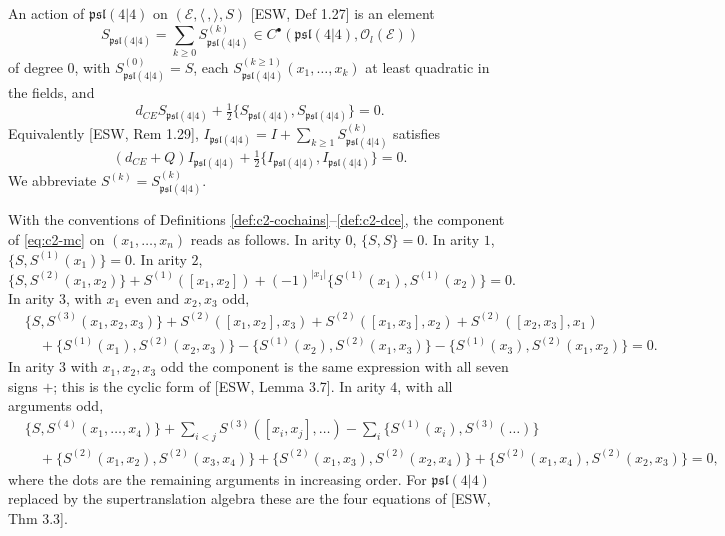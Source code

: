 \begin{definition}
\label{def:c2-action}
An action of $\mathfrak{psl}(4|4)$ on $(\mathscr E,\langle\,,\rangle,S)$ [ESW, Def 1.27] is an element
\[
S_{\mathfrak{psl}(4|4)}=\sum_{k\ge0}S^{(k)}_{\mathfrak{psl}(4|4)}\in C^\bullet(\mathfrak{psl}(4|4),\mathscr O_l(\mathscr E))
\]
of degree $0$, with $S^{(0)}_{\mathfrak{psl}(4|4)}=S$, each $S^{(k\ge1)}_{\mathfrak{psl}(4|4)}(x_1,\dots,x_k)$ at least quadratic in the fields, and
\begin{equation}
d_{CE}S_{\mathfrak{psl}(4|4)}+\tfrac12\{S_{\mathfrak{psl}(4|4)},S_{\mathfrak{psl}(4|4)}\}=0 .
\label{eq:c2-mc}
\end{equation}
Equivalently [ESW, Rem 1.29], $I_{\mathfrak{psl}(4|4)}=I+\sum_{k\ge1}S^{(k)}_{\mathfrak{psl}(4|4)}$ satisfies
\[
(d_{CE}+Q)I_{\mathfrak{psl}(4|4)}+\tfrac12\{I_{\mathfrak{psl}(4|4)},I_{\mathfrak{psl}(4|4)}\}=0 .
\]
We abbreviate $S^{(k)}=S^{(k)}_{\mathfrak{psl}(4|4)}$.
\end{definition}

\begin{lemma}
\label{lem:c2-components}
With the conventions of Definitions \ref{def:c2-cochains}--\ref{def:c2-dce}, the component of \eqref{eq:c2-mc} on $(x_1,\dots,x_n)$ reads as follows. In arity $0$, $\{S,S\}=0$. In arity $1$, $\{S,S^{(1)}(x_1)\}=0$. In arity $2$,
\[
\{S,S^{(2)}(x_1,x_2)\}+S^{(1)}([x_1,x_2])+(-1)^{|x_1|}\{S^{(1)}(x_1),S^{(1)}(x_2)\}=0 .
\]
In arity $3$, with $x_1$ even and $x_2,x_3$ odd,
\[
\begin{aligned}
&\{S,S^{(3)}(x_1,x_2,x_3)\}+S^{(2)}([x_1,x_2],x_3)+S^{(2)}([x_1,x_3],x_2)+S^{(2)}([x_2,x_3],x_1)\\
&\quad+\{S^{(1)}(x_1),S^{(2)}(x_2,x_3)\}-\{S^{(1)}(x_2),S^{(2)}(x_1,x_3)\}-\{S^{(1)}(x_3),S^{(2)}(x_1,x_2)\}=0 .
\end{aligned}
\]
In arity $3$ with $x_1,x_2,x_3$ odd the component is the same expression with all seven signs $+$; this is the cyclic form of [ESW, Lemma 3.7]. In arity $4$, with all arguments odd,
\[
\begin{aligned}
&\{S,S^{(4)}(x_1,\dots,x_4)\}+\sum_{i<j}S^{(3)}([x_i,x_j],\dots)-\sum_i\{S^{(1)}(x_i),S^{(3)}(\dots)\}\\
&\quad+\{S^{(2)}(x_1,x_2),S^{(2)}(x_3,x_4)\}+\{S^{(2)}(x_1,x_3),S^{(2)}(x_2,x_4)\}+\{S^{(2)}(x_1,x_4),S^{(2)}(x_2,x_3)\}=0,
\end{aligned}
\]
where the dots are the remaining arguments in increasing order. For $\mathfrak{psl}(4|4)$ replaced by the supertranslation algebra these are the four equations of [ESW, Thm 3.3].
\end{lemma}

